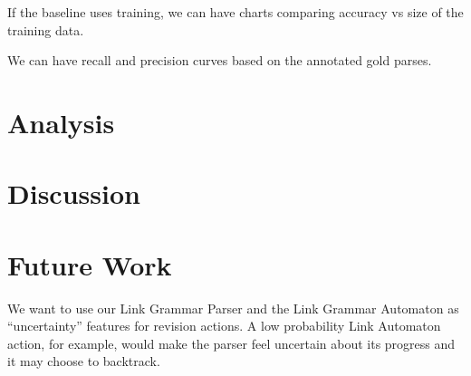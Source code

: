 \documentclass[11pt]{article}
\begin{document}
If the baseline uses training, we can have charts comparing accuracy vs size of the training data.

We can have recall and precision curves based on the annotated gold parses.


\section{Analysis}


\section{Discussion}



\section{Future Work}
We want to use our Link Grammar Parser and the Link Grammar Automaton as ``uncertainty'' features for revision actions. A low probability Link Automaton action, for example, would make the parser feel uncertain about its progress and it may choose to backtrack.





\newpage
\end{document}
